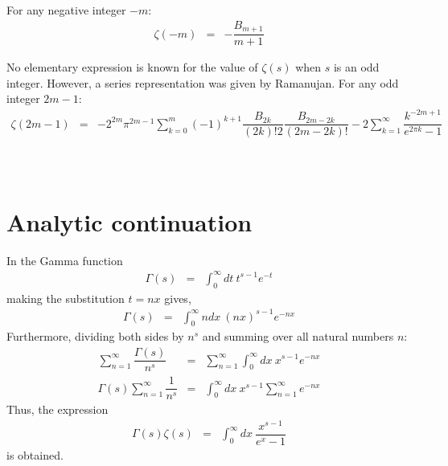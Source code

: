 \documentclass[uplatex,a4j,12pt,dvipdfmx]{jsarticle}
\begin{document}
For any negative integer $-m$:
\begin{eqnarray}
	\zeta(-m)
	&=&
	-
	\dfrac{B_{m+1}}{m+1}
\end{eqnarray}

No elementary expression is known for the value of $\zeta(s)$ when $s$ is an odd integer.
However, a series representation was given by Ramanujan.
For any odd integer $2m-1$:
\begin{eqnarray}
	\zeta(2m-1)
	&=&
	-
	2^{2m} \pi^{2m-1}
	\sum_{k=0}^{m}
	(-1)^{k+1}
	\dfrac{B_{2k}}{(2k)!2}
	\dfrac{B_{2m-2k}}{(2m-2k)!}
	-
	2
	\sum_{k=1}^{\infty}
	\dfrac{ k^{-2m+1} }{ e^{2 \pi k} - 1 }
\end{eqnarray}

${}$

${}$

${}$

\section{Analytic continuation}

In the Gamma function
\begin{eqnarray}
	\Gamma(s)
	&=&
	\int^{\infty}_{0}
	\!\! dt
	\ \! t^{s-1} e^{-t}
\end{eqnarray}
making the substitution $t=nx$ gives,
\begin{eqnarray}
	\Gamma(s)
	&=&
	\int^{\infty}_{0}
	\!\! ndx
	\ \! (nx)^{s-1} e^{-nx}
	\label{eqn:1302120225hayonena}
\end{eqnarray}
Furthermore, dividing both sides by $n^{s}$ and summing over all natural numbers $n$:
\begin{eqnarray}
	\sum_{n=1}^{\infty}
	\dfrac{ \Gamma(s) }{ n^{s} }
	&=&
	\sum_{n=1}^{\infty}
	\int^{\infty}_{0}
	\!\! dx
	\ \! x^{s-1} e^{-nx}
	\nonumber \\
	\Gamma(s)
	\sum_{n=1}^{\infty}
	\dfrac{ 1 }{ n^{s} }
	&=&
	\int^{\infty}_{0}
	\!\! dx
	\ \! x^{s-1}
	\sum_{n=1}^{\infty}
	e^{-nx}
\end{eqnarray}
Thus, the expression
\begin{eqnarray}
	\Gamma(s)
	\zeta(s)
	&=&
	\int^{\infty}_{0}
	\!\! dx
	\ \!
	\dfrac{x^{s-1}}{e^{x} - 1}
	\label{eqn:1302120248nerana}
\end{eqnarray}
is obtained.
\end{document}
